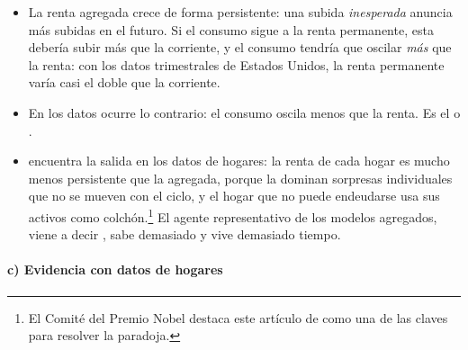 \documentclass[11pt]{article}
\begin{document}
\begin{itemize}
\item La renta agregada crece de forma persistente: una subida \emph{inesperada} anuncia más subidas en el futuro. Si el consumo sigue a la renta permanente, esta debería subir más que la corriente, y el consumo tendría que oscilar \emph{más} que la renta: con los datos trimestrales de Estados Unidos, la renta permanente varía casi el doble que la corriente\nocite{CampbellDeaton1989Why,Nobel2015Scientific}.
\item En los datos ocurre lo contrario: el consumo oscila menos que la renta. Es el  o \nocite{Deaton1987Life}.
\item {} encuentra la salida en los datos de hogares: la renta de cada hogar es mucho menos persistente que la agregada, porque la dominan sorpresas individuales que no se mueven con el ciclo, y el hogar que no puede endeudarse usa sus activos como colchón\nocite{Deaton1991Saving,Deaton1992Understanding}.\footnote{El Comité del Premio Nobel destaca este artículo de \textcite{Deaton1991Saving} como una de las claves para resolver la paradoja\nocite{Nobel2015Scientific}.} El agente representativo de los modelos agregados, viene a decir , sabe demasiado y vive demasiado tiempo.
\end{itemize}

\paragraph{c) Evidencia con datos de hogares}
\end{document}
